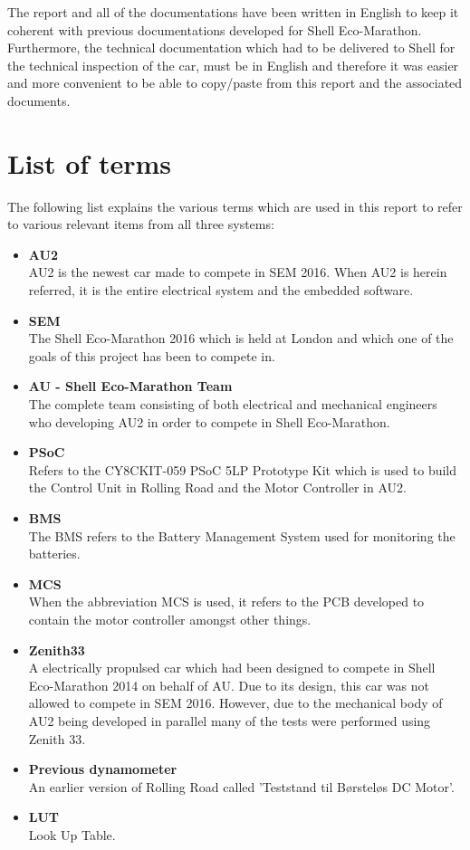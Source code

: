 The report and all of the documentations have been written in English to keep it coherent with previous documentations developed for Shell Eco-Marathon. Furthermore, the technical documentation which had to be delivered to Shell for the technical inspection of the car, must be in English and therefore it was easier and more convenient to be able to copy/paste from this report and the associated documents.

\section{List of terms}
The following list explains the various terms which are used in this report to refer to various relevant items from all three systems:
\begin{itemize}
	\item \textbf{AU2}\\
	AU2 is the newest car made to compete in SEM 2016. When AU2 is herein referred, it is the entire electrical system and the embedded software. 
	\item \textbf{SEM}\\
	The Shell Eco-Marathon 2016 which is held at London and which one of the goals of this project has been to compete in.
	\item \textbf{AU - Shell Eco-Marathon Team}\\
	The complete team consisting of both electrical and mechanical engineers who developing AU2 in order to compete in Shell Eco-Marathon.
	\item \textbf{PSoC}\\
	Refers to the CY8CKIT-059 PSoC 5LP Prototype Kit which is used to build the Control Unit in Rolling Road and the Motor Controller in AU2.
	\item \textbf{BMS}\\
	The BMS refers to the Battery Management System used for monitoring the batteries. 
	\item \textbf{MCS}\\
	When the abbreviation MCS is used, it refers to the PCB developed to contain the motor controller amongst other things.
	\item \textbf{Zenith33}\\
	A electrically propulsed car which had been designed to compete in Shell Eco-Marathon 2014\cite{BAC_zenith33} on behalf of AU. Due to its design, this car was not allowed to compete in SEM 2016. However, due to the mechanical body of AU2 being developed in parallel many of the tests were performed using Zenith 33.
	\item \textbf{Previous dynamometer}\\
	An earlier version of Rolling Road called 'Teststand til Børsteløs DC Motor'\cite{BAC_rullefelt}. 
	\item \textbf{LUT}\\
	Look Up Table. 
\end{itemize}

